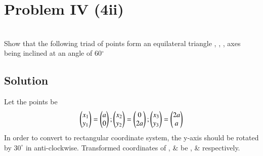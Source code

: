 \documentclass[journal,12pt,twocolumn]{IEEEtran}
\begin{document}
\section{Problem IV (4\Large{ii})}
\\Show that the following triad of points form an equilateral triangle , , , axes being inclined at an angle of 60$^{\circ}$
\subsection{Solution}
Let the points be
\begin{equation}
\begin{pmatrix}x_1\\y_1\end{pmatrix} = \begin{pmatrix}a \\0\end{pmatrix}  ; \begin{pmatrix}x_2\\y_2\end{pmatrix}  = \begin{pmatrix}0\\ 2a\end{pmatrix}; \begin{pmatrix}x_3\\y_3\end{pmatrix} =  \begin{pmatrix}2a \\a\end{pmatrix}\label{1.0.1} 
\end{equation}
In order to convert to rectangular coordinate system, the y-axis should be rotated by $30^{\circ}$ in anti-clockwise.
Transformed coordinates of ,  \&  be ,  \&  respectively.\\\\
\end{document}
